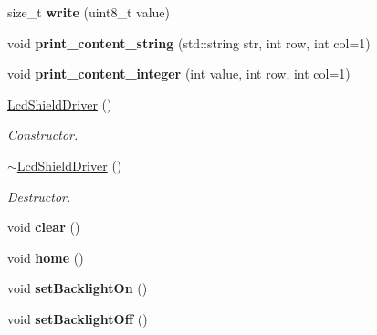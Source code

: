 \begin{DoxyCompactItemize}
\mbox{\label{classLcdShieldDriver_aea03f93f7dfad9bc185bd77ef059c665}} 
size\+\_\+t {\bfseries write} (uint8\+\_\+t value)
\item 
\mbox{\label{classLcdShieldDriver_a893f217db662b34726d0684bb014f7d4}} 
void {\bfseries print\+\_\+content\+\_\+string} (std\+::string str, int row, int col=1)
\item 
\mbox{\label{classLcdShieldDriver_ae1a249341c06d6992767e8176ef96056}} 
void {\bfseries print\+\_\+content\+\_\+integer} (int value, int row, int col=1)
\item 
\mbox{\label{classLcdShieldDriver_a14d2027ac041be273d6b894a6d66bb1f}} 
\hyperlink{classLcdShieldDriver_a14d2027ac041be273d6b894a6d66bb1f}{Lcd\+Shield\+Driver} ()
\begin{DoxyCompactList}\small\item\em Constructor. \end{DoxyCompactList}\item 
\mbox{\label{classLcdShieldDriver_aaec080d1c36326c1e58642a7e28d85b1}} 
\hyperlink{classLcdShieldDriver_aaec080d1c36326c1e58642a7e28d85b1}{$\sim$\+Lcd\+Shield\+Driver} ()
\begin{DoxyCompactList}\small\item\em Destructor. \end{DoxyCompactList}\item 
\mbox{\label{classLcdShieldDriver_a43e151fc827a4d8d982bc2857b78262e}} 
void {\bfseries clear} ()
\item 
\mbox{\label{classLcdShieldDriver_a7bccc296eef476eb49984bdf8fdebb14}} 
void {\bfseries home} ()
\item 
\mbox{\label{classLcdShieldDriver_a68a86a7407fd3df5714f3351d657e499}} 
void {\bfseries set\+Backlight\+On} ()
\item 
\mbox{\label{classLcdShieldDriver_a81639e7553501343137be8984d7ea7d9}} 
void {\bfseries set\+Backlight\+Off} ()
\item 
\mbox{\label{classLcdShieldDriver_a6733a16dc0e1d58cfdfb4019ea2e6582}} 

\end{DoxyCompactItemize}
